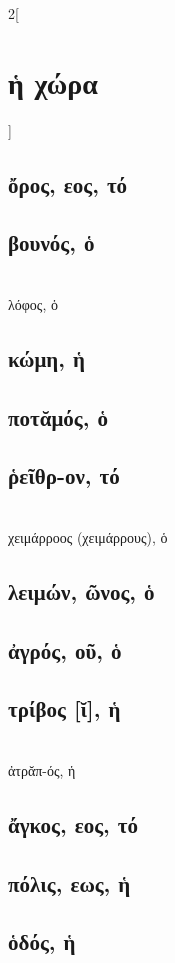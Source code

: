 \documentclass{book}
\begin{document}
\begin{multicols}{2}[\section{ἡ χώρα}]
\subsection{ὄρος, εος, τό}
\subsection{βουνός, ὁ}
 ~\\
λόφος, ὁ 
\subsection{κώμη, ἡ}
\subsection{ποτᾰμός, ὁ}
\subsection{ῥεῖθρ-ον, τό}
 ~\\
χειμάρροος (χειμάρρους), ὁ
\subsection{λειμών, ῶνος, ὁ}
\subsection{ἀγρός, οῦ, ὁ}
\subsection{τρίβος [ῐ], ἡ}
 ~\\
ἀτρᾰπ-ός, ἡ  
\subsection{ἄγκος, εος, τό}
\subsection{πόλις, εως, ἡ}
\subsection{ὁδός, ἡ}

\end{multicols}
\end{document}
